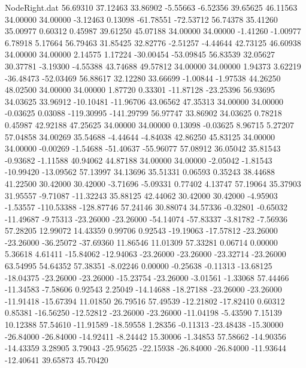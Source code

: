 \begin{filecontents}{NodeRight.dat}
  56.69310   37.12463   33.86902    -5.55663   -6.52356   39.65625   46.11563   34.00000   34.00000   -3.12463    0.13098  -61.78551  -72.53712
  56.74378   35.41260   35.00977     0.60312    0.45987   39.61250   45.07188   34.00000   34.00000   -1.41260   -1.00977    6.78918    5.17664
  56.79463   31.85425   32.82776    -2.51257   -4.44644   42.73125   46.60938   34.00000   34.00000    2.14575    1.17224  -30.00454  -53.09845
  56.83539   32.05627   30.37781    -3.19300   -4.55388   43.74688   49.57812   34.00000   34.00000    1.94373    3.62219  -36.48473  -52.03469
  56.88617   32.12280   33.66699    -1.00844   -1.97538   44.26250   48.02500   34.00000   34.00000    1.87720    0.33301  -11.87128  -23.25396
  56.93695   34.03625   33.96912   -10.10481  -11.96706   43.06562   47.35313   34.00000   34.00000   -0.03625    0.03088 -119.30995 -141.29799
  56.97747   33.86902   34.03625     0.78218    0.45987   42.92188   47.25625   34.00000   34.00000    0.13098   -0.03625    8.96715    5.27207
  57.04858   34.00269   35.54688    -4.44644   -4.84038   42.86250   45.83125   34.00000   34.00000   -0.00269   -1.54688  -51.40637  -55.96077
  57.08912   36.05042   35.81543    -0.93682   -1.11588   40.94062   44.87188   34.00000   34.00000   -2.05042   -1.81543  -10.99420  -13.09562
  57.13997   34.13696   35.51331     0.06593    0.35243   38.44688   41.22500   30.42000   30.42000   -3.71696   -5.09331    0.77402    4.13747
  57.19064   35.37903   31.95557    -9.71087  -11.32243   35.88125   42.44062   30.42000   30.42000   -4.95903   -1.53557 -110.53388 -128.87746
  57.24146   30.88074   34.57336    -0.32801   -0.65032  -11.49687   -9.75313  -23.26000  -23.26000  -54.14074  -57.83337   -3.81782   -7.56936
  57.28205   12.99072   14.43359     0.99706    0.92543  -19.19063  -17.57812  -23.26000  -23.26000  -36.25072  -37.69360   11.86546   11.01309
  57.33281    0.06714    0.00000     5.36618    4.61411  -15.84062  -12.94063  -23.26000  -23.26000  -23.32714  -23.26000   63.54995   54.64352
  57.38351   -8.02246    0.00000    -0.25638   -0.11313  -13.68125  -18.04375  -23.26000  -23.26000  -15.23754  -23.26000   -3.01561   -1.33068
  57.44466  -11.34583   -7.58606     0.92543    2.25049  -14.14688  -18.27188  -23.26000  -23.26000  -11.91418  -15.67394   11.01850   26.79516
  57.49539  -12.21802  -17.82410     0.60312    0.85381  -16.56250  -12.52812  -23.26000  -23.26000  -11.04198   -5.43590    7.15139   10.12388
  57.54610  -11.91589  -18.59558     1.28356   -0.11313  -23.48438  -15.30000  -26.84000  -26.84000  -14.92411   -8.24442   15.30006   -1.34853
  57.58662  -14.90356  -14.43359     3.28905    3.79043  -25.95625  -22.15938  -26.84000  -26.84000  -11.93644  -12.40641   39.65873   45.70420

\end{filecontents}
